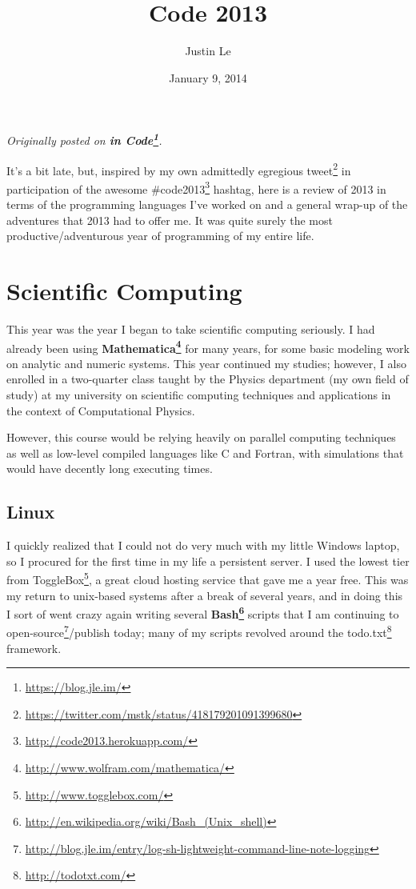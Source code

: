 \documentclass[]{article}
\title{Code 2013}
\author{Justin Le}
\date{January 9, 2014}
\renewcommand{\href}[2]{#2\footnote{\url{#1}}}
\begin{document}
\maketitle

\emph{Originally posted on \textbf{\href{https://blog.jle.im/}{in
Code}}.}

It's a bit late, but, inspired by my own admittedly egregious
\href{https://twitter.com/mstk/status/418179201091399680}{tweet} in
participation of the awesome
\href{http://code2013.herokuapp.com/}{\#code2013} hashtag, here is a
review of 2013 in terms of the programming languages I've worked on and
a general wrap-up of the adventures that 2013 had to offer me. It was
quite surely the most productive/adventurous year of programming of my
entire life.

\section{Scientific Computing}\label{scientific-computing}

This year was the year I began to take scientific computing seriously. I
had already been using
\textbf{\href{http://www.wolfram.com/mathematica/}{Mathematica}} for
many years, for some basic modeling work on analytic and numeric
systems. This year continued my studies; however, I also enrolled in a
two-quarter class taught by the Physics department (my own field of
study) at my university on scientific computing techniques and
applications in the context of Computational Physics.

However, this course would be relying heavily on parallel computing
techniques as well as low-level compiled languages like C and Fortran,
with simulations that would have decently long executing times.

\subsection{Linux}\label{linux}

I quickly realized that I could not do very much with my little Windows
laptop, so I procured for the first time in my life a persistent server.
I used the lowest tier from \href{http://www.togglebox.com/}{ToggleBox},
a great cloud hosting service that gave me a year free. This was my
return to unix-based systems after a break of several years, and in
doing this I sort of went crazy again writing several
\textbf{\href{http://en.wikipedia.org/wiki/Bash_(Unix_shell)}{Bash}}
scripts that I am continuing to
\href{http://blog.jle.im/entry/log-sh-lightweight-command-line-note-logging}{open-source}/publish
today; many of my scripts revolved around the
\href{http://todotxt.com/}{todo.txt} framework.
\end{document}
